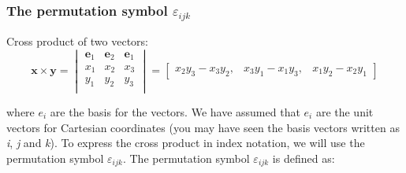 \documentclass[notes]{beamer}
\begin{document}
\begin{frame}
\frametitle{The permutation symbol $\varepsilon_{ijk}$}
Cross product of two vectors:
\begin{equation*}
\mathbf{x \times y} = 
\begin{vmatrix}
\mathbf{e}_1 & \mathbf{e}_2 & \mathbf{e}_1 \\
x_1 & x_2 & x_3 \\
y_1 & y_2 & y_3 \\
\end{vmatrix} = 
\begin{bmatrix}
x_2 y_3 - x_3 y_2, & x_3 y_1 - x_1 y_3, &
x_1 y_2 - x_2 y_1
\end{bmatrix}
\end{equation*}

where $e_i$ are the basis for the vectors. We have assumed that $e_i$ are the unit vectors for
Cartesian coordinates (you may have seen the basis vectors written as \textit{i}, \textit{j} and \textit{k}). To express the cross product in index notation, we will use the permutation symbol $\varepsilon_{ijk}$. The permutation symbol $\varepsilon_{ijk}$ is defined as:
\end{frame}
\end{document}
